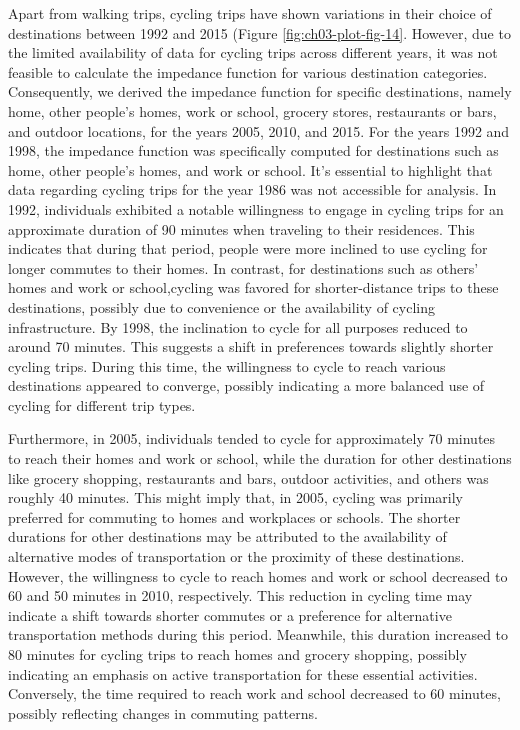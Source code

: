 \documentclass[
11pt, %
oneside, %
english, %
singlespacing, %
]{macthesis} %
\begin{document}
Apart from walking trips, cycling trips have shown variations in their choice of destinations between 1992 and 2015 (Figure \ref{fig:ch03-plot-fig-14}. However, due to the limited availability of data for cycling trips across different years, it was not feasible to calculate the impedance function for various destination categories. Consequently, we derived the impedance function for specific destinations, namely home, other people's homes, work or school, grocery stores, restaurants or bars, and outdoor locations, for the years 2005, 2010, and 2015. For the years 1992 and 1998, the impedance function was specifically computed for destinations such as home, other people's homes, and work or school. It's essential to highlight that data regarding cycling trips for the year 1986 was not accessible for analysis. In 1992, individuals exhibited a notable willingness to engage in cycling trips for an approximate duration of 90 minutes when traveling to their residences. This indicates that during that period, people were more inclined to use cycling for longer commutes to their homes. In contrast, for destinations such as others' homes and work or school,cycling was favored for shorter-distance trips to these destinations, possibly due to convenience or the availability of cycling infrastructure. By 1998, the inclination to cycle for all purposes reduced to around 70 minutes. This suggests a shift in preferences towards slightly shorter cycling trips. During this time, the willingness to cycle to reach various destinations appeared to converge, possibly indicating a more balanced use of cycling for different trip types.

Furthermore, in 2005, individuals tended to cycle for approximately 70 minutes to reach their homes and work or school, while the duration for other destinations like grocery shopping, restaurants and bars, outdoor activities, and others was roughly 40 minutes. This might imply that, in 2005, cycling was primarily preferred for commuting to homes and workplaces or schools. The shorter durations for other destinations may be attributed to the availability of alternative modes of transportation or the proximity of these destinations. However, the willingness to cycle to reach homes and work or school decreased to 60 and 50 minutes in 2010, respectively. This reduction in cycling time may indicate a shift towards shorter commutes or a preference for alternative transportation methods during this period. Meanwhile, this duration increased to 80 minutes for cycling trips to reach homes and grocery shopping, possibly indicating an emphasis on active transportation for these essential activities. Conversely, the time required to reach work and school decreased to 60 minutes, possibly reflecting changes in commuting patterns.
\end{document}
